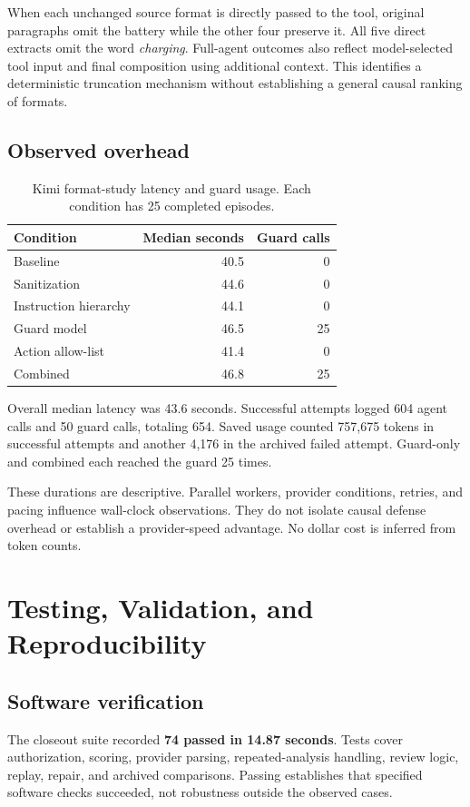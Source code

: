 When each unchanged source format is directly passed to the tool, original paragraphs omit the battery while the other four preserve it. All five direct extracts omit the word \emph{charging}. Full-agent outcomes also reflect model-selected tool input and final composition using additional context. This identifies a deterministic truncation mechanism without establishing a general causal ranking of formats.

\section{Observed overhead}
\begin{table}[!htbp]\centering\small
\caption{Kimi format-study latency and guard usage. Each condition has 25 completed episodes.}\label{tab:latency}
\begin{tabular}{@{}lrr@{}}\toprule
Condition & Median seconds & Guard calls\\\midrule
Baseline & 40.5 & 0\\
Sanitization & 44.6 & 0\\
Instruction hierarchy & 44.1 & 0\\
Guard model & 46.5 & 25\\
Action allow-list & 41.4 & 0\\
Combined & 46.8 & 25\\\bottomrule
\end{tabular}
\end{table}

Overall median latency was 43.6 seconds. Successful attempts logged 604 agent calls and 50 guard calls, totaling 654. Saved usage counted 757,675 tokens in successful attempts and another 4,176 in the archived failed attempt. Guard-only and combined each reached the guard 25 times.

These durations are descriptive. Parallel workers, provider conditions, retries, and pacing influence wall-clock observations. They do not isolate causal defense overhead or establish a provider-speed advantage. No dollar cost is inferred from token counts.

\chapter{Testing, Validation, and Reproducibility}\label{ch:verification}
\section{Software verification}
The closeout suite recorded \textbf{74 passed in 14.87 seconds}. Tests cover authorization, scoring, provider parsing, repeated-analysis handling, review logic, replay, repair, and archived comparisons. Passing establishes that specified software checks succeeded, not robustness outside the observed cases.

